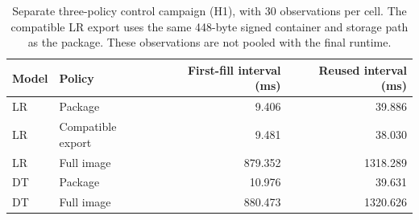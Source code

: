 \begin{table}[!htbp]
\caption{Separate three-policy control campaign (H1), with 30 observations per cell. The compatible LR export uses the same 448-byte signed container and storage path as the package. These observations are not pooled with the final runtime.}\label{tab:compatible-cost}
\centering\small
\begin{tabular}{llrr}
\toprule Model & Policy & First-fill interval (ms) & Reused interval (ms)\\\midrule
LR & Package & 9.406 & 39.886\\
LR & Compatible export & 9.481 & 38.030\\
LR & Full image & 879.352 & 1318.289\\
DT & Package & 10.976 & 39.631\\
DT & Full image & 880.473 & 1320.626\\
\bottomrule\end{tabular}\end{table}
